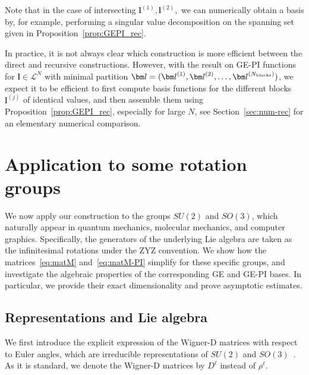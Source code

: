 \documentclass{article}
\newcommand{\rep}[2]{\rho^{#1}_{#2}}
\numberwithin{equation}{section}
\def\Nb{{N_{\rm blocks}}}
\def\bl{{\bm l}}
\def\calL{\mathcal{L}}
\begin{document}
{Note that in the case of intersecting $\bl^{(1)},\bl^{(2)},$ we can numerically obtain a basis by, for example, performing a singular value decomposition on the spanning set given in Proposition~\ref{prop:GEPI_rec}.


\medskip

In practice, it is not always clear which construction is more efficient between the direct and recursive constructions. However, with the result on GE-PI functions for $\bl\in\calL^N$ with minimal partition $\bl=(\bl^{(1)},\bl^{(2)},\ldots,\bl^{(\Nb)})$, we expect it to be efficient to first compute basis functions for the different blocks $\bl^{(j)}$ of identical values, and then assemble them using Proposition~\ref{prop:GEPI_rec}, especially for large $N$, see Section~\ref{sec:num-rec} for an elementary numerical comparison.



\section{Application to some rotation groups}\label{sec:appl}

We now apply our construction to the groups  $SU(2)$ and $SO(3)$, which naturally appear in quantum mechanics, molecular mechanics, and computer graphics. Specifically, the generators of the underlying Lie algebra are taken as the infinitesimal rotations under the ZYZ convention. We show how the matrices~\eqref{eq:matM} and~\eqref{eq:matM-PI} 
simplify for these specific groups, and investigate the algebraic properties of the corresponding GE and GE-PI bases. In particular, we provide their exact dimensionality and prove asymptotic estimates.


\subsection{Representations and Lie algebra}
We first introduce the explicit expression of the Wigner-D matrices with respect to Euler angles, which are irreducible representations of $SU(2)$ and $SO(3)$~\cite{wigner1931gruppentheorie}. As it is standard, we denote the Wigner-D matrices by $D^\ell$ instead of $\rep{\ell}{}$.

}
\end{document}
